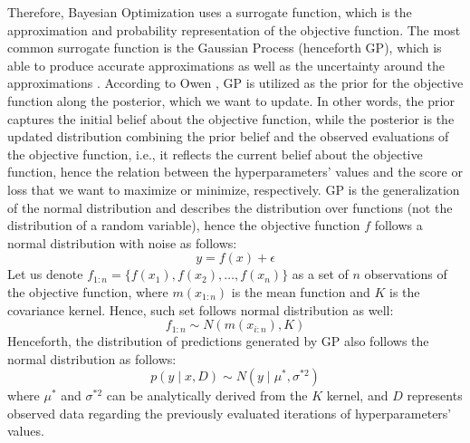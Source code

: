 Therefore, Bayesian Optimization uses a surrogate function, which is the approximation and probability representation of the objective function. The most common surrogate function is the Gaussian Process (henceforth GP), which is able to produce accurate approximations as well as the uncertainty around the approximations \citep{wang2020bayesian}.
According to Owen \citep{owen2022hyperparameter}, GP is utilized as the prior for the objective function along the posterior, which we want to update.
In other words, the prior captures the initial belief about the objective function, while the posterior is the updated distribution combining the prior belief and the observed evaluations of the objective function, i.e., it reflects the current belief about the objective function, hence the relation between the hyperparameters' values and the score or loss that we want to maximize or minimize, respectively.
GP is the generalization of the normal distribution and describes the distribution over functions (not the distribution of a random variable), hence the objective function $f$ follows a normal distribution with noise as follows:
\begin{equation}\label{eq}
    y = f\left(x\right) + \epsilon
\end{equation}
Let us denote $f_{1:n} = \{ f\left(x_1\right), f\left(x_2\right), \ldots, f\left(x_n\right)\}$ as a set of $n$ observations of the objective function, where $m\left(x_{1:n}\right)$ is the mean function and $K$ is the covariance kernel. Hence, such set follows normal distribution as well:
\begin{equation}\label{eq}
f_{1:n} \sim N\left(m\left(x_{i:n}\right), K\right)
\end{equation}
Henceforth, the distribution of predictions generated by GP also follows the normal distribution as follows:
\begin{equation}\label{eq}
p\left(y \mid x, D\right) \sim N\left(y \mid \mu^{*}, \sigma^{*2}\right)
\end{equation}
where $\mu^{*}$ and $\sigma^{*2}$ can be analytically derived from the $K$ kernel, and $D$ represents observed data regarding the previously evaluated iterations of hyperparameters' values.


